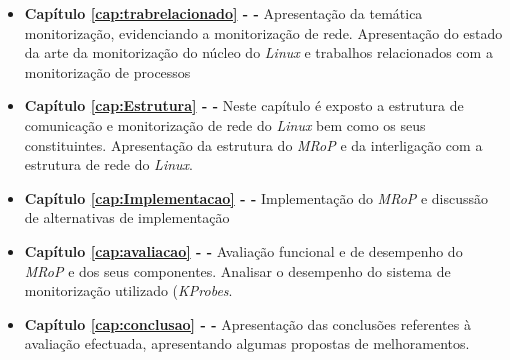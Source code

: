 \begin{itemize}
	\item \textbf{Capítulo \ref{cap:trabrelacionado} -  - } Apresentação da temática monitorização, evidenciando a monitorização de rede. Apresentação do estado da arte da monitorização do núcleo do \textit{Linux} e trabalhos relacionados com a monitorização de processos

	\item \textbf{Capítulo \ref{cap:Estrutura} -   - } Neste capítulo é exposto a estrutura de comunicação e monitorização de rede do \textit{Linux} bem como os seus constituintes. Apresentação da estrutura do \textit{MRoP} e da interligação com a estrutura de rede do \textit{Linux}.

	\item \textbf{Capítulo \ref{cap:Implementacao} -  - } Implementação do \textit{MRoP} e discussão de alternativas de implementação

	\item \textbf{Capítulo \ref{cap:avaliacao} -  - } Avaliação funcional e de desempenho do \textit{MRoP} e dos seus componentes. Analisar o desempenho do sistema de monitorização utilizado (\textit{KProbes}.

	\item \textbf{Capítulo \ref{cap:conclusao} -  - } Apresentação das conclusões referentes à avaliação efectuada, apresentando algumas propostas de melhoramentos.

\end{itemize}
